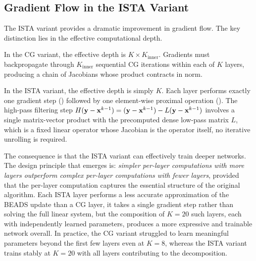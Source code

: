\subsection{Gradient Flow in the ISTA Variant}
\label{sec:method_gradient_flow}

The ISTA variant provides a dramatic improvement in gradient flow. The key distinction lies in the effective computational depth.

In the CG variant, the effective depth is $K \times K_{\text{inner}}$. Gradients must backpropagate through $K_{\text{inner}}$ sequential CG iterations within each of $K$ layers, producing a chain of Jacobians whose product contracts in norm.

In the ISTA variant, the effective depth is simply $K$. Each layer performs exactly one gradient step () followed by one element-wise proximal operation (). The high-pass filtering step $H(\mathbf{y} - \mathbf{x}^{k-1}) = (\mathbf{y} - \mathbf{x}^{k-1}) - L(\mathbf{y} - \mathbf{x}^{k-1})$ involves a single matrix-vector product with the precomputed dense low-pass matrix $L$, which is a fixed linear operator whose Jacobian is the operator itself, no iterative unrolling is required.


The consequence is that the ISTA variant can effectively train deeper networks. The design principle that emerges is: \emph{simpler per-layer computations with more layers outperform complex per-layer computations with fewer layers}, provided that the per-layer computation captures the essential structure of the original algorithm. Each ISTA layer performs a less accurate approximation of the BEADS update than a CG layer, it takes a single gradient step rather than solving the full linear system, but the composition of $K = 20$ such layers, each with independently learned parameters, produces a more expressive and trainable network overall. In practice, the CG variant struggled to learn meaningful parameters beyond the first few layers even at $K = 8$, whereas the ISTA variant trains stably at $K = 20$ with all layers contributing to the decomposition.


